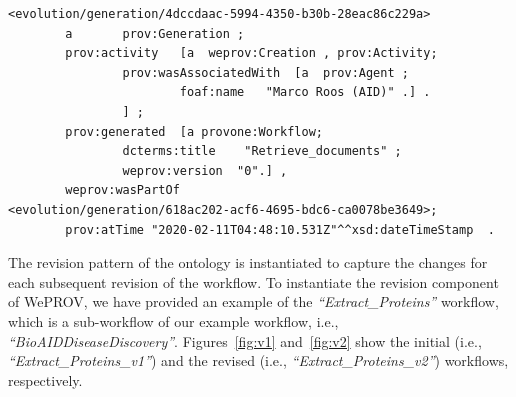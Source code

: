 \documentclass[ao]{iosart2x}
\begin{document}
\begin{lstlisting}[frame=single, caption={BioAIDDiseaseDiscovery workflow creation provenance},label={lst:creation-prov}]
<evolution/generation/4dccdaac-5994-4350-b30b-28eac86c229a>
        a       prov:Generation ;
        prov:activity   [a  weprov:Creation , prov:Activity;
                prov:wasAssociatedWith  [a  prov:Agent ;
                        foaf:name   "Marco Roos (AID)" .] .
                ] ;
        prov:generated  [a provone:Workflow;
                dcterms:title    "Retrieve_documents" ;
                weprov:version  "0".] ,
        weprov:wasPartOf                <evolution/generation/618ac202-acf6-4695-bdc6-ca0078be3649>;
        prov:atTime "2020-02-11T04:48:10.531Z"^^xsd:dateTimeStamp  .
\end{lstlisting}
\vspace{0.5cm}

The revision pattern of the ontology is instantiated to capture the changes for each subsequent revision of the workflow.
To instantiate the revision component of WePROV, we have provided an example of the \textit{``Extract\_Proteins''} workflow, which is a sub-workflow of our  example workflow, i.e., \textit{``BioAIDDiseaseDiscovery''}.
Figures~\ref{fig:v1} and~\ref{fig:v2} show the initial (i.e., \textit{``Extract\_Proteins\_v1''}) and the revised (i.e., \textit{``Extract\_Proteins\_v2''}) workflows, respectively. 
\end{document}
